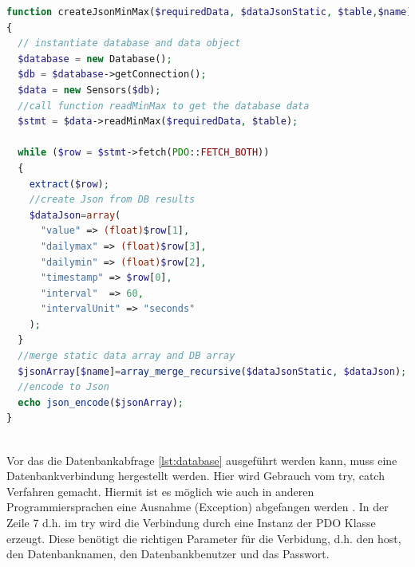 \begin{lstlisting}[label=lst:createJson,caption=Beispiel erstellung des Jsons, language=php, style=php]
function createJsonMinMax($requiredData, $dataJsonStatic, $table,$name)
{
  // instantiate database and data object
  $database = new Database();
  $db = $database->getConnection();
  $data = new Sensors($db);
  //call function readMinMax to get the database data
  $stmt = $data->readMinMax($requiredData, $table);

  while ($row = $stmt->fetch(PDO::FETCH_BOTH))
  {
    extract($row);
    //create Json from DB results
    $dataJson=array(
      "value" => (float)$row[1],
      "dailymax" => (float)$row[3],
      "dailymin" => (float)$row[2],
      "timestamp" => $row[0],
      "interval"  => 60,
      "intervalUnit" => "seconds"
    );
  }
  //merge static data array and DB array
  $jsonArray[$name]=array_merge_recursive($dataJsonStatic, $dataJson);
  //encode to Json
  echo json_encode($jsonArray);
}



\end{lstlisting}
Vor das die Datenbankabfrage \ref{lst:database} ausgeführt werden kann, muss eine Datenbankverbindung hergestellt werden. Hier wird Gebrauch vom try, catch Verfahren gemacht. Hiermit ist es möglich wie auch in anderen Programmiersprachen eine Ausnahme (Exception) abgefangen werden \cite{Ausnahmebehandlung:ThePHPGroup}. In der Zeile 7 d.h. im try wird die Verbindung durch eine Instanz der PDO Klasse erzeugt. Diese benötigt die richtigen Parameter für die Verbidung, d.h. den host, den Datenbanknamen, den Datenbankbenutzer und das Passwort.

